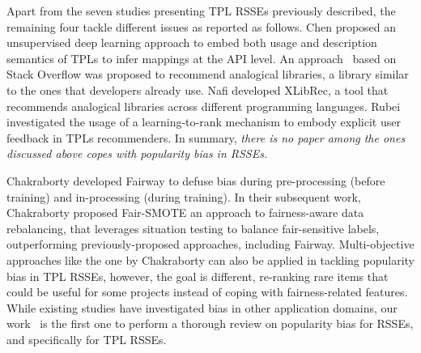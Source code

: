 Apart from the seven studies presenting TPL RSSEs previously described, the remaining four %
tackle different issues as reported as follows. Chen \etal \cite{8630054} proposed an unsupervised deep learning approach to embed both usage and description semantics of TPLs to infer mappings at the API level. %
An approach~\cite{10.1007/s10664-018-9657-y} based on Stack Overflow was proposed to recommend analogical libraries, \ie a library similar to the ones that developers already use. Nafi \etal \cite{9825781} developed XLibRec, a tool that recommends analogical libraries across different programming languages. %
Rubei \etal \cite{9825861} investigated the usage of a learning-to-rank mechanism to embody explicit user feedback in TPLs recommenders. In summary, \emph{there is no paper among the ones discussed above copes with popularity bias in RSSEs.}



Chakraborty \etal \cite{ChakrabortyM0M20} %
developed Fairway to defuse bias during pre-processing (\ie before training) and in-processing (\ie during training). %
In their subsequent work, Chakraborty \etal \cite{ChakrabortyMM21} 
proposed Fair-SMOTE an approach to fairness-aware data rebalancing,  that leverages situation testing to balance fair-sensitive labels, outperforming previously-proposed approaches, including %
Fairway. %
Multi-objective approaches like the one by Chakraborty \etal can also be applied in tackling popularity bias in TPL RSSEs, however, the goal is different, \ie re-ranking rare items that could be useful for some projects instead of coping with fairness-related features. 
While existing studies have investigated bias in other application domains, our work~\cite{10174041} is the first one to perform a thorough review on popularity bias for RSSEs, and specifically for TPL RSSEs. %



